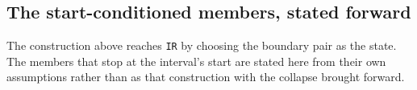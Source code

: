 \begin{appendixbox}

\subsection*{The start-conditioned members, stated forward}

The construction above reaches \texttt{IR} by choosing the boundary pair as the state. The members
that stop at the interval's start are stated here from their own assumptions rather than as that
construction with the collapse brought forward.


\end{appendixbox}
